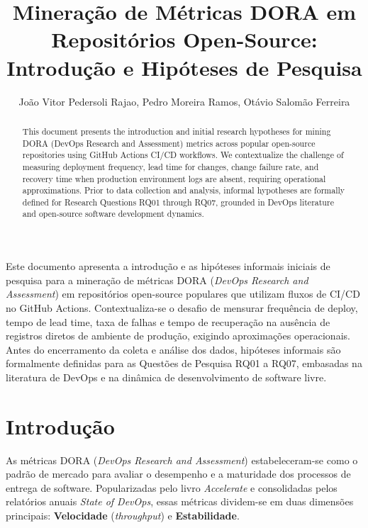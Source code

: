 \documentclass[12pt]{article}
\title{Mineração de Métricas DORA em Repositórios Open-Source:\\Introdução e Hipóteses de Pesquisa}
\author{João Vitor Pedersoli Rajao\inst{1}, Pedro Moreira Ramos\inst{1}, Otávio Salomão Ferreira\inst{1}}
\begin{document}
\maketitle

\begin{abstract}
  This document presents the introduction and initial research hypotheses for mining DORA (DevOps Research and Assessment) metrics across popular open-source repositories using GitHub Actions CI/CD workflows. We contextualize the challenge of measuring deployment frequency, lead time for changes, change failure rate, and recovery time when production environment logs are absent, requiring operational approximations. Prior to data collection and analysis, informal hypotheses are formally defined for Research Questions RQ01 through RQ07, grounded in DevOps literature and open-source software development dynamics.
\end{abstract}

\begin{resumo}
  Este documento apresenta a introdução e as hipóteses informais iniciais de pesquisa para a mineração de métricas DORA (\textit{DevOps Research and Assessment}) em repositórios open-source populares que utilizam fluxos de CI/CD no GitHub Actions. Contextualiza-se o desafio de mensurar frequência de deploy, tempo de lead time, taxa de falhas e tempo de recuperação na ausência de registros diretos de ambiente de produção, exigindo aproximações operacionais. Antes do encerramento da coleta e análise dos dados, hipóteses informais são formalmente definidas para as Questões de Pesquisa RQ01 a RQ07, embasadas na literatura de DevOps e na dinâmica de desenvolvimento de software livre.
\end{resumo}

\section{Introdução}

As métricas DORA (\textit{DevOps Research and Assessment}) estabeleceram-se como o padrão de mercado para avaliar o desempenho e a maturidade dos processos de entrega de software. Popularizadas pelo livro \textit{Accelerate} \cite{forsgren2018accelerate} e consolidadas pelos relatórios anuais \textit{State of DevOps}, essas métricas dividem-se em duas dimensões principais: \textbf{Velocidade} (\textit{throughput}) e \textbf{Estabilidade}.
\end{document}
